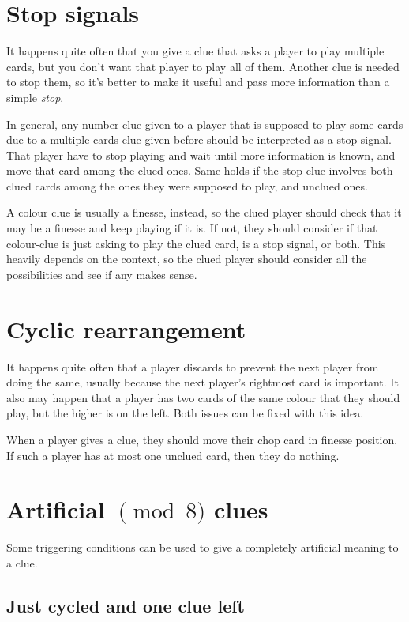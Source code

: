 \documentclass[a4paper]{article}
\theoremstyle{plain}
\theoremstyle{definition}
\begin{document}
\section{Stop signals}
\label{stopsignals}

It happens quite often that you give a clue that asks a player to play multiple cards, but you don't want that player to play all of them. Another clue is needed to stop them, so it's better to make it useful and pass more information than a simple \textit{stop}.

In general, any number clue given to a player that is supposed to play some cards due to a multiple cards clue given before should be interpreted as a stop signal. That player have to stop playing and wait until more information is known, and move that card among the clued ones. Same holds if the stop clue involves both clued cards among the ones they were supposed to play, and unclued ones.

A colour clue is usually a finesse, instead, so the clued player should check that it may be a finesse and keep playing if it is. If not, they should consider if that colour-clue is just asking to play the clued card, is a stop signal, or both. This heavily depends on the context, so the clued player should consider all the possibilities and see if any makes sense.

\section{Cyclic rearrangement}

It happens quite often that a player discards to prevent the next player from doing the same, usually because the next player's rightmost card is important. It also may happen that a player has two cards of the same colour that they should play, but the higher is on the left. Both issues can be fixed with this idea.

When a player gives a clue, they should move their chop card in finesse position. If such a player has at most one unclued card, then they do nothing.

\section{Artificial $\pmod 8$ clues}

Some triggering conditions can be used to give a completely artificial meaning to a clue.

\subsection{Just cycled and one clue left}
\end{document}
